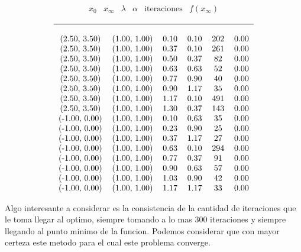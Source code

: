 \documentclass[letterpaper]{article}
\begin{document}
\[ \begin{matrix}
    x_{0} & x_{\infty} & \lambda & \alpha & \text{iteraciones} & f(x_{\infty}) \\
  \end{matrix}
\]
\[
\begin{tabular}{c c c c c c}
  \hline \\
(2.50, 3.50)  & (1.00, 1.00) & 0.10 & 0.10 & 202 & 0.00 \\
(2.50, 3.50)  & (1.00, 1.00) & 0.37 & 0.10 & 261 & 0.00 \\
(2.50, 3.50)  & (1.00, 1.00) & 0.50 & 0.37 & 82  & 0.00 \\
(2.50, 3.50)  & (1.00, 1.00) & 0.63 & 0.63 & 52  & 0.00 \\
(2.50, 3.50)  & (1.00, 1.00) & 0.77 & 0.90 & 40  & 0.00 \\
(2.50, 3.50)  & (1.00, 1.00) & 0.90 & 1.17 & 35  & 0.00 \\
(2.50, 3.50)  & (1.00, 1.00) & 1.17 & 0.10 & 491 & 0.00 \\
(2.50, 3.50)  & (1.00, 1.00) & 1.30 & 0.37 & 143 & 0.00 \\
(-1.00, 0.00) & (1.00, 1.00) & 0.10 & 0.63 & 35  & 0.00 \\
(-1.00, 0.00) & (1.00, 1.00) & 0.23 & 0.90 & 25  & 0.00 \\
(-1.00, 0.00) & (1.00, 1.00) & 0.37 & 1.17 & 27  & 0.00 \\
(-1.00, 0.00) & (1.00, 1.00) & 0.63 & 0.10 & 294 & 0.00 \\
(-1.00, 0.00) & (1.00, 1.00) & 0.77 & 0.37 & 91  & 0.00 \\
(-1.00, 0.00) & (1.00, 1.00) & 0.90 & 0.63 & 57  & 0.00 \\
(-1.00, 0.00) & (1.00, 1.00) & 1.03 & 0.90 & 42  & 0.00 \\
(-1.00, 0.00) & (1.00, 1.00) & 1.17 & 1.17 & 33  & 0.00 \\
\end{tabular}
\]

Algo interesante a considerar es la consistencia de la cantidad de
iteraciones que le toma llegar al optimo, siempre tomando a lo mas 300
iteraciones y siempre llegando al punto minimo de la funcion. Podemos
considerar que con mayor certeza este metodo para el cual este problema
converge.
\end{document}

